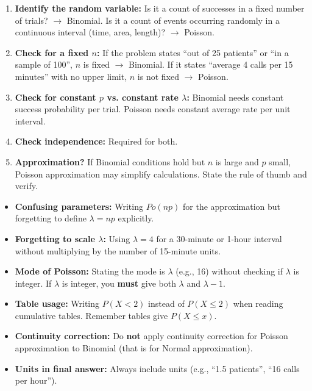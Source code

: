 \documentclass[11pt]{article}
\begin{document}
\begin{methode}
\begin{enumerate}
\item \textbf{Identify the random variable:} Is it a count of successes in a fixed number of trials? $\to$ Binomial. Is it a count of events occurring randomly in a continuous interval (time, area, length)? $\to$ Poisson.
\item \textbf{Check for a fixed $n$:} If the problem states ``out of 25 patients'' or ``in a sample of 100'', $n$ is fixed $\to$ Binomial. If it states ``average 4 calls per 15 minutes'' with no upper limit, $n$ is not fixed $\to$ Poisson.
\item \textbf{Check for constant $p$ vs. constant rate $\lambda$:} Binomial needs constant success probability per trial. Poisson needs constant average rate per unit interval.
\item \textbf{Check independence:} Required for both.
\item \textbf{Approximation?} If Binomial conditions hold but $n$ is large and $p$ small, Poisson approximation may simplify calculations. State the rule of thumb and verify.
\end{enumerate}
\end{methode}

\begin{attention}
\begin{itemize}
\item \textbf{Confusing parameters:} Writing $Po(np)$ for the approximation but forgetting to define $\lambda = np$ explicitly.
\item \textbf{Forgetting to scale $\lambda$:} Using $\lambda=4$ for a 30-minute or 1-hour interval without multiplying by the number of 15-minute units.
\item \textbf{Mode of Poisson:} Stating the mode is $\lambda$ (e.g., 16) without checking if $\lambda$ is integer. If $\lambda$ is integer, you \textbf{must} give both $\lambda$ and $\lambda-1$.
\item \textbf{Table usage:} Writing $P(X < 2)$ instead of $P(X \le 2)$ when reading cumulative tables. Remember tables give $P(X \le x)$.
\item \textbf{Continuity correction:} Do \textbf{not} apply continuity correction for Poisson approximation to Binomial (that is for Normal approximation).
\item \textbf{Units in final answer:} Always include units (e.g., ``1.5 patients'', ``16 calls per hour'').
\end{itemize}
\end{attention}
\end{document}
